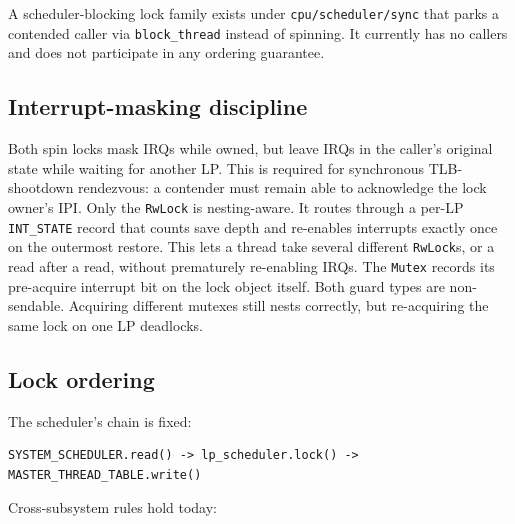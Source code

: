 A scheduler-blocking lock family exists under
\texttt{cpu/scheduler/sync} that parks a contended caller via
\texttt{block\_thread} instead of spinning. It currently has no callers and
does not participate in any ordering guarantee.

\subsection{Interrupt-masking discipline}

Both spin locks mask IRQs while owned, but leave IRQs in the caller's original
state while waiting for another LP. This is required for synchronous
TLB-shootdown rendezvous: a contender must remain able to acknowledge the
lock owner's IPI. Only the \texttt{RwLock} is nesting-aware. It
routes through a per-LP \texttt{INT\_STATE} record that counts save depth and
re-enables interrupts exactly once on the outermost restore. This lets a thread
take several different \texttt{RwLock}s, or a read after a read, without
prematurely re-enabling IRQs. The \texttt{Mutex} records its pre-acquire
interrupt bit on the lock object itself. Both guard types are non-sendable.
Acquiring different mutexes still nests correctly, but re-acquiring the same
lock on one LP deadlocks.

\subsection{Lock ordering}

The scheduler's chain is fixed:

\begin{lstlisting}[style=rustCode]
SYSTEM_SCHEDULER.read() -> lp_scheduler.lock() -> MASTER_THREAD_TABLE.write()
\end{lstlisting}

Cross-subsystem rules hold today:


